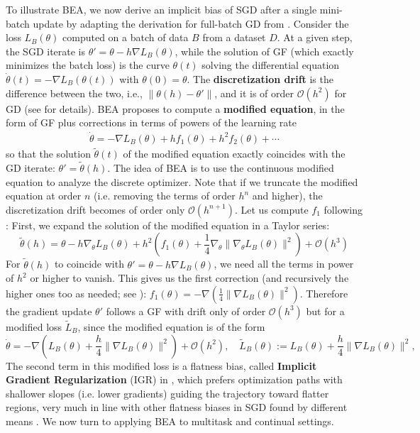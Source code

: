 \documentclass{article}
\begin{document}
To illustrate BEA, we now derive an implicit bias of SGD after a single mini-batch update by adapting the derivation for full-batch GD from \cite{barrett2021implicit}. Consider the loss $L_B(\theta)$ computed on a batch of data $B$ from a dataset $D$. At a given step, the SGD iterate is $\theta' = \theta - h\nabla L_B(\theta)$, while the solution of GF (which exactly minimizes the batch loss) is the curve $\theta(t)$ solving the differential equation $\dot \theta(t) = -\nabla L_B(\theta(t))$ with $\theta(0) = \theta$. The {\bf discretization drift} is the difference between the two, i.e., $\|\theta(h) - \theta'\|$, and it is of order $\mathcal O(h^2)$ for GD (see \cite{hairer2006geometric} for details).
BEA proposes to compute a {\bf modified equation}, in the form of GF plus corrections in terms of powers of the learning rate
\begin{eqnarray}
\dot \theta = -\nabla L_B(\theta) + h f_1(\theta) + h^2 f_2(\theta) + \cdots
\end{eqnarray}
so that the solution $\tilde \theta(t)$ of the modified equation exactly coincides with the GD iterate: $\theta' = \tilde \theta(h)$. The idea of BEA is to use the continuous modified equation to analyze the discrete optimizer.
Note that if we truncate the modified equation at order $n$ (i.e. removing the terms of order $h^n$ and higher), the discretization drift becomes of order only $\mathcal O(h^{n+1})$.
 Let us compute $f_1$ following  \cite{barrett2021implicit}: First, we expand the solution of the modified equation in a Taylor series:
\begin{equation}
    \tilde \theta(h) = \theta - h\nabla_\theta L_B(\theta) 
    + h^2\left(f_1(\theta) + \frac 14 \nabla_\theta \|\nabla_\theta L_B(\theta)\|^2\right) + \mathcal O(h^3)
\end{equation}
For $\tilde \theta(h)$ to coincide with $\theta'= \theta - h\nabla L_B(\theta)$, we need all the terms in power of $h^2$ or higher to vanish. This gives us the first correction (and recursively the higher ones too as needed; see \cite{hairer2006geometric,barrett2021implicit,rosca2023on, miyagawa2022equation_of_motion}): $f_1(\theta) = -\nabla \left(\frac 14 \|\nabla L_B(\theta)\|^2\right)$. Therefore the gradient update $\theta'$ follows a GF with drift only of order $\mathcal O(h^3)$ but for a modified loss $\widetilde L_B$, since the modified equation is of the form
\begin{equation}\label{eq:local_sgd_modified_loss}
\dot \theta = - \nabla\left( L_B(\theta) + \frac h4 \|\nabla L_B(\theta)\|^2\right) + \mathcal O(h^2),
\quad
\widetilde L_B(\theta) := L_B(\theta) + \frac h4 \|\nabla L_B(\theta)\|^2,
\end{equation}
The second term in this modified loss is a flatness bias, called {\bf Implicit Gradient Regularization} (IGR) in \cite{barrett2021implicit}, which prefers optimization paths with shallower slopes (i.e. lower gradients) guiding the trajectory toward flatter regions, very much in line with other flatness biases in SGD found by different means \cite{damian2021label,ma2021linear_stability_of_sgd,Blanc2019ImplicitRF,jastrzebski2021catastrophic}. 
We now turn to applying BEA to multitask and continual settings.
\end{document}
